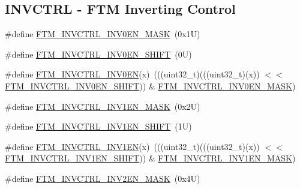 \subsection*{I\+N\+V\+C\+T\+RL -\/ F\+TM Inverting Control}
\begin{DoxyCompactItemize}
\item 
\#define \mbox{\hyperlink{group___f_t_m___register___masks_ga29b0b3d76d82f4c673556bd71b97ee9d}{F\+T\+M\+\_\+\+I\+N\+V\+C\+T\+R\+L\+\_\+\+I\+N\+V0\+E\+N\+\_\+\+M\+A\+SK}}~(0x1\+U)
\item 
\#define \mbox{\hyperlink{group___f_t_m___register___masks_ga15a13f74f3f9db42b9be7ce492976fef}{F\+T\+M\+\_\+\+I\+N\+V\+C\+T\+R\+L\+\_\+\+I\+N\+V0\+E\+N\+\_\+\+S\+H\+I\+FT}}~(0\+U)
\item 
\#define \mbox{\hyperlink{group___f_t_m___register___masks_ga679ec6bef1d875fb7e92a3ea737a28b2}{F\+T\+M\+\_\+\+I\+N\+V\+C\+T\+R\+L\+\_\+\+I\+N\+V0\+EN}}(x)~(((uint32\+\_\+t)(((uint32\+\_\+t)(x)) $<$$<$ \mbox{\hyperlink{group___f_t_m___register___masks_ga15a13f74f3f9db42b9be7ce492976fef}{F\+T\+M\+\_\+\+I\+N\+V\+C\+T\+R\+L\+\_\+\+I\+N\+V0\+E\+N\+\_\+\+S\+H\+I\+FT}})) \& \mbox{\hyperlink{group___f_t_m___register___masks_ga29b0b3d76d82f4c673556bd71b97ee9d}{F\+T\+M\+\_\+\+I\+N\+V\+C\+T\+R\+L\+\_\+\+I\+N\+V0\+E\+N\+\_\+\+M\+A\+SK}})
\item 
\#define \mbox{\hyperlink{group___f_t_m___register___masks_gaaa85e1e86e9cc91e49e68c33a91d5194}{F\+T\+M\+\_\+\+I\+N\+V\+C\+T\+R\+L\+\_\+\+I\+N\+V1\+E\+N\+\_\+\+M\+A\+SK}}~(0x2\+U)
\item 
\#define \mbox{\hyperlink{group___f_t_m___register___masks_ga6d544c535dc1c3710f37e5ed3f0e6acc}{F\+T\+M\+\_\+\+I\+N\+V\+C\+T\+R\+L\+\_\+\+I\+N\+V1\+E\+N\+\_\+\+S\+H\+I\+FT}}~(1\+U)
\item 
\#define \mbox{\hyperlink{group___f_t_m___register___masks_gab39299fc30d8d23a0be05de473fc6901}{F\+T\+M\+\_\+\+I\+N\+V\+C\+T\+R\+L\+\_\+\+I\+N\+V1\+EN}}(x)~(((uint32\+\_\+t)(((uint32\+\_\+t)(x)) $<$$<$ \mbox{\hyperlink{group___f_t_m___register___masks_ga6d544c535dc1c3710f37e5ed3f0e6acc}{F\+T\+M\+\_\+\+I\+N\+V\+C\+T\+R\+L\+\_\+\+I\+N\+V1\+E\+N\+\_\+\+S\+H\+I\+FT}})) \& \mbox{\hyperlink{group___f_t_m___register___masks_gaaa85e1e86e9cc91e49e68c33a91d5194}{F\+T\+M\+\_\+\+I\+N\+V\+C\+T\+R\+L\+\_\+\+I\+N\+V1\+E\+N\+\_\+\+M\+A\+SK}})
\item 
\#define \mbox{\hyperlink{group___f_t_m___register___masks_ga529f3c3f58ca2c039fee08830dfe3a8a}{F\+T\+M\+\_\+\+I\+N\+V\+C\+T\+R\+L\+\_\+\+I\+N\+V2\+E\+N\+\_\+\+M\+A\+SK}}~(0x4\+U)
\item 

\end{DoxyCompactItemize}
